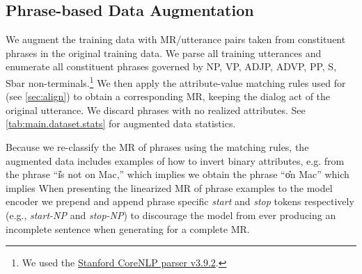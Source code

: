 \subsection{Phrase-based Data Augmentation}

We augment the training data with MR/utterance pairs taken from constituent
phrases in the original training data.  We parse all training utterances and
enumerate all constituent phrases governed by NP, VP, ADJP, ADVP, PP, S, Sbar
non-terminals.\footnote{We used the
\href{https://stanfordnlp.github.io/CoreNLP/}{Stanford CoreNLP parser
v3.9.2}.} We then apply the attribute-value matching rules used for
 (see \autoref{sec:align}) to obtain a corresponding MR, keeping
the dialog act of the original utterance. We discard phrases with no realized
attributes.  See \autoref{tab:main.dataset.stats} for augmented data
statistics.

Because we re-classify the MR of phrases using the matching rules, the
augmented  data includes examples of how to invert binary attributes, e.g.
from the phrase ``\U{is not on Mac,}'' which implies
 we obtain the phrase ``\U{on Mac}''
which implies  When presenting the linearized
MR of phrase examples to the model encoder we prepend and append phrase
specific \textit{start} and \textit{stop} tokens respectively (e.g.,
\textit{start-NP} and \textit{stop-NP}) to discourage the model from ever
producing an incomplete sentence when generating for a complete MR.
